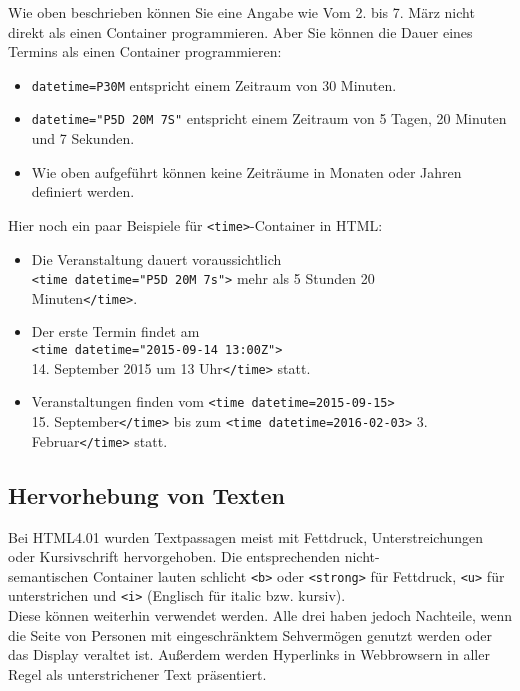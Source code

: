 Wie oben beschrieben können Sie eine Angabe wie \glqq{}Vom 2. bis 7. März\grqq{} nicht direkt als einen Container programmieren. Aber Sie können die Dauer eines Termins als einen Container programmieren:

\begin{itemize}
	\item \verb|datetime=P30M| entspricht einem Zeitraum von 30 Minuten.
	\item \verb|datetime="P5D 20M 7S"| entspricht einem Zeitraum von 5 Tagen, 20 Minuten und 7 Sekunden.
	\item Wie oben aufgeführt können keine Zeiträume in Monaten oder Jahren definiert werden.
\end{itemize}

Hier noch ein paar Beispiele für \verb|<time>|-Container in HTML:

\begin{itemize}
	\item Die Veranstaltung dauert voraussichtlich\\\verb|<time datetime="P5D 20M 7s">| mehr als 5 Stunden 20 \\Minuten\verb|</time>|.
	\item Der erste Termin findet am \\\verb|<time datetime="2015-09-14 13:00Z">|\\14. September 2015 um 13 Uhr\verb|</time>| statt.
	\item Veranstaltungen finden vom \verb|<time datetime=2015-09-15>|\\15. September\verb|</time>| bis zum \verb|<time datetime=2016-02-03>| 3. Februar\verb|</time>| statt.
\end{itemize}

\subsection{Hervorhebung von Texten}

Bei HTML4.01 wurden Textpassagen meist mit Fettdruck, Unterstreichungen oder Kursivschrift hervorgehoben. Die entsprechenden nicht-\\semantischen Container lauten schlicht \verb|<b>| oder \verb|<strong>| für Fettdruck, \verb|<u>| für unterstrichen und \verb|<i>| (Englisch für italic bzw. kursiv). \\

Diese können weiterhin verwendet werden. Alle drei haben jedoch Nachteile, wenn die Seite von Personen mit eingeschränktem Sehvermögen genutzt werden oder das Display veraltet ist. Außerdem werden Hyperlinks in Webbrowsern in aller Regel als unterstrichener Text präsentiert.\\

